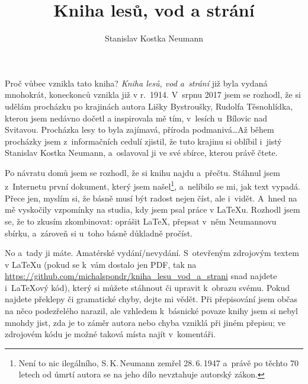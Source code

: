 \documentclass{book}
\title{Kniha lesů, vod a strání}
\author{Stanislav Kostka Neumann}
\begin{document}
\maketitle
\newpage
Proč vůbec vznikla tato kniha? \textit{Kniha lesů, vod a~strání} již byla vydaná mnohokrát, koneckonců vznikla již v r.~1914. V~srpnu 2017 jsem se rozhodl, že si udělám procházku po krajinách autora Lišky Bystroušky, Rudolfa Těsnohlídka, kterou jsem nedávno dočetl a inspirovala mě tím, v~lesích u~Bílovic nad Svitavou. Procházka lesy to byla zajímavá, příroda podmanivá\ldots Až během procházky jsem z~informačních cedulí zjistil, že tuto krajinu si oblíbil i~jistý Stanislav Kostka Neumann, a~oslavoval ji ve své sbírce, kterou právě čtete.

\medskip
Po návratu domů jsem se rozhodl, že si knihu najdu a~přečtu. Stáhnul jsem z~Internetu první dokument, který jsem našel\footnote{Není to nic ilegálního, S.\,K.\,Neumann zemřel 28.\,6.\,1947 a~právě po těchto 70 letech od úmrtí autora se na jeho dílo nevztahuje autorský zákon.}, a~nelíbilo se mi, jak text vypadá. Přece jen, myslím si, že básně musí být radost nejen číst, ale i~vidět. A~hned na mě vyskočily vzpomínky na studia, kdy jsem psal práce v \LaTeX{}u. Rozhodl jsem se, že to zkusím zkombinovat: oprášit \LaTeX, přepsat v~něm Neumannovu sbírku, a~zároveň si u~toho básně důkladně pročíst.

\medskip
No a~tady ji máte. Amatérské vydání/nevydání. S~otevřeným zdrojovým textem v LaTeXu (pokud se k~vám dostalo jen PDF, tak na \url{https://github.com/michalspondr/kniha_lesu_vod_a_strani} snad najdete i~\LaTeX{}ový kód), který si můžete stáhnout či upravit k~obrazu svému. Pokud najdete překlepy či gramatické chyby, dejte mi vědět. Při přepisování jsem občas na něco podezřelého narazil, ale vzhledem k~básnické povaze knihy jsem si nebyl mnohdy jist, zda je to záměr autora nebo chyba vzniklá při jiném přepisu; ve zdrojovém kódu je možné taková místa najít v~komentáři.
\end{document}
